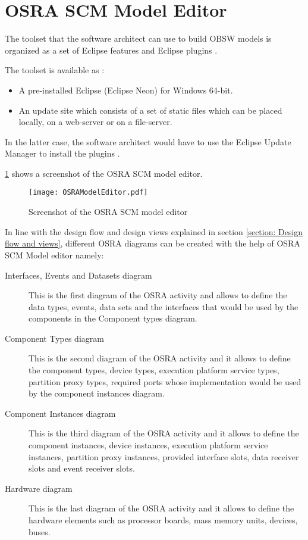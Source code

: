 \section{OSRA SCM Model Editor}
\label{section: OSRA editor} 
The toolset that the software architect can use to build OBSW models is organized as a set of Eclipse features and Eclipse plugins \cite{OSRAEditor}. 

The toolset is available as \cite{OSRAEditor}:
\begin{itemize}
\item A pre-installed Eclipse (Eclipse Neon) for Windows 64-bit.  
\item An update site which consists of a set of static files which can be placed locally, on a web-server or on a file-server. 
\end{itemize}
In the latter case, the software architect would have to use the Eclipse Update Manager to install the plugins \cite{OSRAEditor}. 

\cref{fig: OSRA model editor} shows a screenshot of the OSRA SCM model editor.

\begin{figure}[h]
	\centering
	\texttt{[image: OSRAModelEditor.pdf]}
	\caption{Screenshot of the OSRA SCM model editor}
	\label{fig: OSRA model editor}
\end{figure}

In line with the design flow and design views explained in section \cref{section: Design flow and views}, different OSRA diagrams can be created with the help of OSRA SCM Model editor namely:
\begin{description}
\item [Interfaces, Events and Datasets diagram] This is the first diagram of the OSRA activity and allows to define the data types, events, data sets and the interfaces that would be used by the components in the Component types diagram.
\item [Component Types diagram] This is the second diagram of the OSRA activity and it allows to define the component types, device types, execution platform service types, partition proxy types, required ports whose implementation would be used by the component instances diagram.
\item [Component Instances diagram] This is the third diagram of the OSRA activity and it allows to define the component instances, device instances, execution platform service instances, partition proxy instances, provided interface slots, data receiver slots and event receiver slots.
\item [Hardware diagram] This is the last diagram of the OSRA activity and it allows to define the hardware elements such as processor boards, mass memory units, devices, buses.
\end{description}


